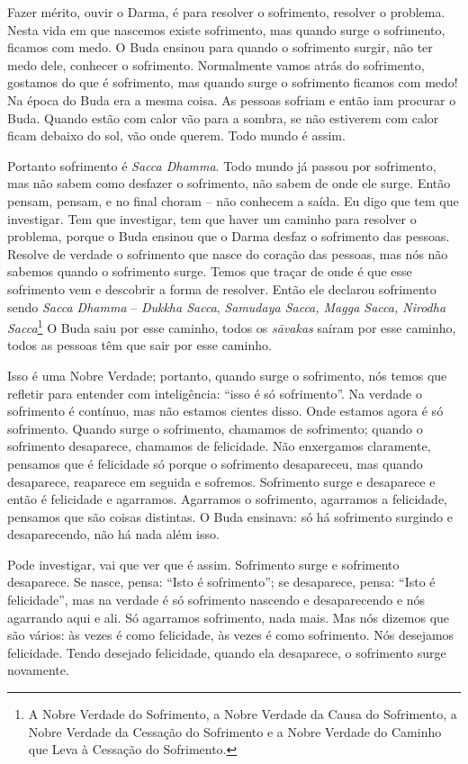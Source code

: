 Fazer mérito, ouvir o Darma, é para resolver o sofrimento, resolver
o problema. Nesta vida em que nascemos existe sofrimento, mas quando
surge o sofrimento, ficamos com medo. O Buda ensinou para quando o
sofrimento surgir, não ter medo dele, conhecer o sofrimento.
Normalmente vamos atrás do sofrimento, gostamos do que é sofrimento,
mas quando surge o sofrimento ficamos com medo! Na época do Buda era a
mesma coisa. As pessoas sofriam e então iam procurar o Buda. Quando
estão com calor vão para a sombra, se não estiverem com calor ficam
debaixo do sol, vão onde querem. Todo mundo é assim. 

Portanto sofrimento é \textit{Sacca Dhamma}. Todo mundo já passou
por sofrimento, mas não sabem como desfazer o sofrimento, não sabem de
onde ele surge. Então pensam, pensam, e no final choram
– não conhecem a saída. Eu digo que tem que
investigar. Tem que investigar, tem que haver um caminho para resolver
o problema, porque o Buda ensinou que o Darma desfaz o sofrimento das
pessoas. Resolve de verdade o sofrimento que nasce do coração das
pessoas, mas nós não sabemos quando o sofrimento surge. Temos que
traçar de onde é que esse sofrimento vem e descobrir a forma de
resolver. Então ele declarou sofrimento sendo \textit{Sacca Dhamma }–
\textit{Dukkha Sacca}, \textit{Samudaya Sacca, Magga Sacca, Nirodha
Sacca}\footnote{A Nobre Verdade do Sofrimento, a Nobre Verdade da Causa
do Sofrimento, a Nobre Verdade da Cessação do Sofrimento e a Nobre
Verdade do Caminho que Leva à Cessação do Sofrimento.} O Buda saiu por
esse caminho, todos os \textit{s\=avakas} saíram por esse caminho,
todos as pessoas têm que sair por esse caminho. 

Isso é uma Nobre Verdade; portanto, quando surge o sofrimento, nós
temos que refletir para entender com inteligência: “isso é só
sofrimento”. Na verdade o sofrimento é contínuo, mas não estamos
cientes disso. Onde estamos agora é só sofrimento. Quando surge o
sofrimento, chamamos de sofrimento; quando o sofrimento desaparece,
chamamos de felicidade. Não enxergamos claramente, pensamos que é
felicidade só porque o sofrimento desapareceu, mas quando desaparece,
reaparece em seguida e sofremos. Sofrimento
surge e desaparece e então é felicidade e agarramos. Agarramos o
sofrimento, agarramos a felicidade, pensamos que são coisas distintas.
O Buda ensinava: só há sofrimento surgindo e desaparecendo, não há nada
além isso. 

Pode investigar, vai que ver que é assim. Sofrimento surge e
sofrimento desaparece. Se nasce, pensa: “Isto é sofrimento”; se
desaparece, pensa: “Isto é felicidade”, mas na verdade é só sofrimento
nascendo e desaparecendo e nós agarrando aqui e ali. Só agarramos
sofrimento, nada mais. Mas nós dizemos que são vários: às vezes é como
felicidade, às vezes é como sofrimento. Nós desejamos felicidade. Tendo
desejado felicidade, quando ela desaparece, o sofrimento surge
novamente. 


